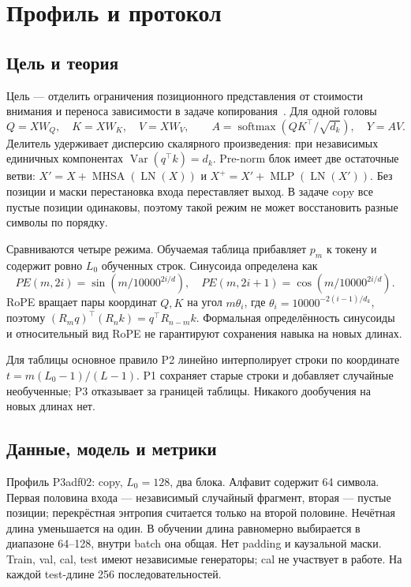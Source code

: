 \section{Профиль и протокол}
\subsection{Цель и теория}
Цель --- отделить ограничения позиционного представления от стоимости внимания и переноса зависимости в задаче копирования~\cite{teacher}. Для одной головы
\begin{equation}Q=XW_Q,\quad K=XW_K,\quad V=XW_V,\qquad A=\operatorname{softmax}(QK^\top/\sqrt{d_k}),\quad Y=AV.\end{equation}
Делитель удерживает дисперсию скалярного произведения: при независимых единичных компонентах $\operatorname{Var}(q^\top k)=d_k$. Pre-norm блок имеет две остаточные ветви: $X'=X+\operatorname{MHSA}(\operatorname{LN}(X))$ и $X^+=X'+\operatorname{MLP}(\operatorname{LN}(X'))$. Без позиции и маски перестановка входа переставляет выход. В задаче copy все пустые позиции одинаковы, поэтому такой режим не может восстановить разные символы по порядку.

Сравниваются четыре режима. Обучаемая таблица прибавляет $p_m$ к токену и содержит ровно $L_0$ обученных строк. Синусоида определена как
\begin{equation}PE(m,2i)=\sin(m/10000^{2i/d}),\quad PE(m,2i+1)=\cos(m/10000^{2i/d}).\end{equation}
RoPE вращает пары координат $Q,K$ на угол $m\theta_i$, где $\theta_i=10000^{-2(i-1)/d_k}$, поэтому $(R_mq)^\top(R_nk)=q^\top R_{n-m}k$. Формальная определённость синусоиды и относительный вид RoPE не гарантируют сохранения навыка на новых длинах.

Для таблицы основное правило P2 линейно интерполирует строки по координате $t=m(L_0-1)/(L-1)$. P1 сохраняет старые строки и добавляет случайные необученные; P3 отказывает за границей таблицы. Никакого дообучения на новых длинах нет.

\subsection{Данные, модель и метрики}
Профиль P3adf02: copy, $L_0=128$, два блока. Алфавит содержит 64 символа. Первая половина входа --- независимый случайный фрагмент, вторая --- пустые позиции; перекрёстная энтропия считается только на второй половине. Нечётная длина уменьшается на один. В обучении длина равномерно выбирается в диапазоне 64--128, внутри batch она общая. Нет padding и каузальной маски. Train, val, cal, test имеют независимые генераторы; cal не участвует в работе. На каждой test-длине 256 последовательностей.


